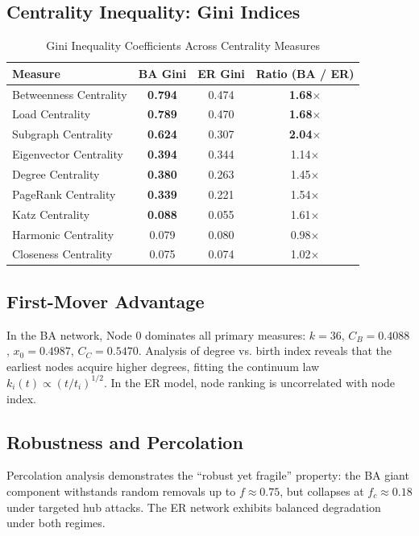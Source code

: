 \documentclass[11pt,a4paper]{article}
\begin{document}
\subsection{Centrality Inequality: Gini Indices}
\begin{table}[ht]
\centering
\caption{Gini Inequality Coefficients Across Centrality Measures}
\label{tab:gini_metrics}
\begin{tabular}{lccc}
\toprule
\textbf{Measure} & \textbf{BA Gini} & \textbf{ER Gini} & \textbf{Ratio (BA / ER)} \\
\midrule
Betweenness Centrality & \textbf{0.794} & 0.474 & \textbf{1.68$\times$} \\
Load Centrality & \textbf{0.789} & 0.470 & \textbf{1.68$\times$} \\
Subgraph Centrality & \textbf{0.624} & 0.307 & \textbf{2.04$\times$} \\
Eigenvector Centrality & \textbf{0.394} & 0.344 & 1.14$\times$ \\
Degree Centrality & \textbf{0.380} & 0.263 & 1.45$\times$ \\
PageRank Centrality & \textbf{0.339} & 0.221 & 1.54$\times$ \\
Katz Centrality & \textbf{0.088} & 0.055 & 1.61$\times$ \\
Harmonic Centrality & 0.079 & 0.080 & 0.98$\times$ \\
Closeness Centrality & 0.075 & 0.074 & 1.02$\times$ \\
\bottomrule
\end{tabular}
\end{table}

\subsection{First-Mover Advantage}
In the BA network, Node 0 dominates all primary measures: $k=36$, $C_B=0.4088$, $x_0=0.4987$, $C_C=0.5470$. Analysis of degree vs. birth index reveals that the earliest nodes acquire higher degrees, fitting the continuum law $k_i(t) \propto (t/t_i)^{1/2}$. In the ER model, node ranking is uncorrelated with node index.

\subsection{Robustness and Percolation}
Percolation analysis demonstrates the ``robust yet fragile'' property: the BA giant component withstands random removals up to $f \approx 0.75$, but collapses at $f_c \approx 0.18$ under targeted hub attacks. The ER network exhibits balanced degradation under both regimes.
\end{document}

